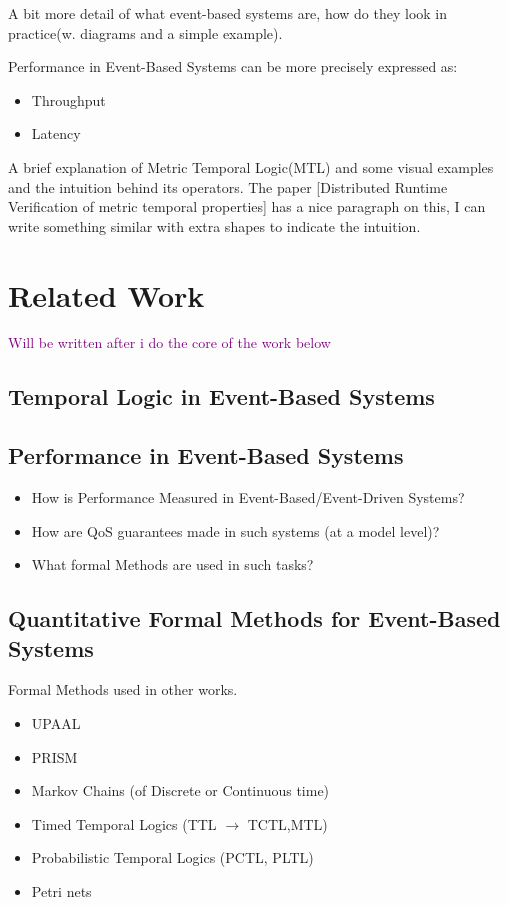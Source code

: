 \documentclass{article}
\newcommand{\note}[1] {
	\textcolor{Purple}{#1}

}
\begin{document}
\par
A bit more detail of what event-based systems are, how do they look in practice(w. diagrams and a simple example).


\par
Performance in Event-Based Systems can be more precisely expressed as:
\begin{itemize}
	\item Throughput
	\item Latency
\end{itemize}

\par
A brief explanation of Metric Temporal Logic(MTL) and some visual examples and the intuition behind its operators. The paper [Distributed Runtime Verification of metric temporal properties] has a nice paragraph on this, I can write something similar with extra shapes to indicate the intuition.


\section{Related Work}

\note{Will be written after i do the core of the work below}

\subsection{Temporal Logic in Event-Based Systems}
\subsection{Performance in Event-Based Systems}
\begin{itemize}
	\item How is Performance Measured in Event-Based/Event-Driven Systems?
	\item How are QoS guarantees made in such systems (at a model level)?
	\item What formal Methods are used in such tasks?
\end{itemize}


\subsection{Quantitative Formal Methods for Event-Based Systems }
Formal Methods used in other works.
\begin{itemize}
	\item UPAAL
	\item PRISM
	\item Markov Chains (of Discrete or Continuous time)
	\item Timed Temporal Logics (TTL $\rightarrow$ TCTL,MTL)
	\item Probabilistic Temporal Logics (PCTL, PLTL)
	\item Petri nets
\end{itemize}
\end{document}

